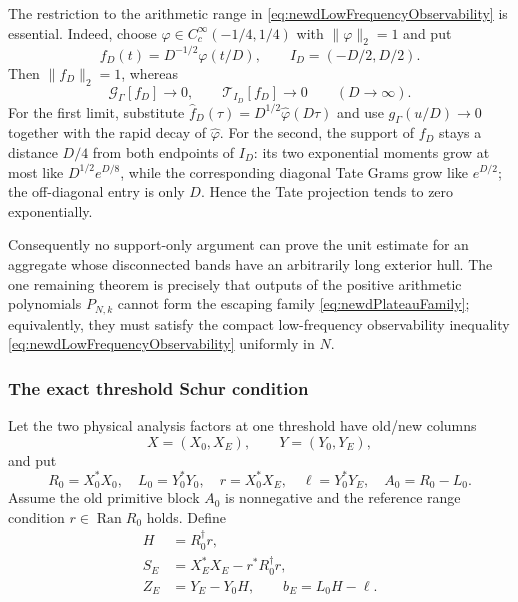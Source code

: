 \documentclass[11pt]{amsart}
\theoremstyle{definition}
\theoremstyle{remark}
\begin{document}
The restriction to the arithmetic range in
\eqref{eq:newdLowFrequencyObservability} is essential.  Indeed, choose
$\varphi\in C_c^\infty(-1/4,1/4)$ with $\|\varphi\|_2=1$ and put
\begin{equation}\label{eq:newdPlateauFamily}
 f_D(t)=D^{-1/2}\varphi(t/D),
 \qquad I_D=(-D/2,D/2).
\end{equation}
Then $\|f_D\|_2=1$, whereas
\begin{equation}\label{eq:newdPlateauEscape}
 \mathcal G_\Gamma[f_D]\longrightarrow0,
 \qquad
 \mathcal T_{I_D}[f_D]\longrightarrow0
 \qquad(D\to\infty).
\end{equation}
For the first limit, substitute
$\widehat f_D(\tau)=D^{1/2}\widehat\varphi(D\tau)$ and use
$g_\Gamma(u/D)\to0$ together with the rapid decay of
$\widehat\varphi$.  For the second, the support of $f_D$ stays a distance
$D/4$ from both endpoints of $I_D$: its two exponential moments grow at
most like $D^{1/2}e^{D/8}$, while the corresponding diagonal Tate Grams
grow like $e^{D/2}$; the off-diagonal entry is only $D$.  Hence the Tate
projection tends to zero exponentially.

Consequently no support-only argument can prove the unit estimate for an
aggregate whose disconnected bands have an arbitrarily long exterior
hull.  The one remaining theorem is precisely that
outputs of the positive arithmetic polynomials
$P_{N,k}$ cannot form the escaping family
\eqref{eq:newdPlateauFamily}; equivalently, they must satisfy the compact
low-frequency observability inequality
\eqref{eq:newdLowFrequencyObservability} uniformly in $N$.

\subsubsection{The exact threshold Schur condition}

Let the two physical analysis factors at one threshold have old/new columns
\[
 X=(X_0,X_E),\qquad Y=(Y_0,Y_E),
\]
and put
\begin{equation}\label{eq:newdPhysicalBlocks}
 R_0=X_0^*X_0,
 \quad L_0=Y_0^*Y_0,
 \quad r=X_0^*X_E,
 \quad \ell=Y_0^*Y_E,
 \quad A_0=R_0-L_0.
\end{equation}
Assume the old primitive block $A_0$ is nonnegative and the reference range
condition $r\in\operatorname{Ran}R_0$ holds.  Define
\begin{align}
 H&=R_0^\dagger r,
 \label{eq:newdReferenceLift}\\
 S_E&=X_E^*X_E-r^*R_0^\dagger r,
 \label{eq:newdReferenceSchur}\\
 Z_E&=Y_E-Y_0H,
 \qquad
 b_E=L_0H-\ell.
 \label{eq:newdOppositeResidual}
\end{align}
\end{document}
